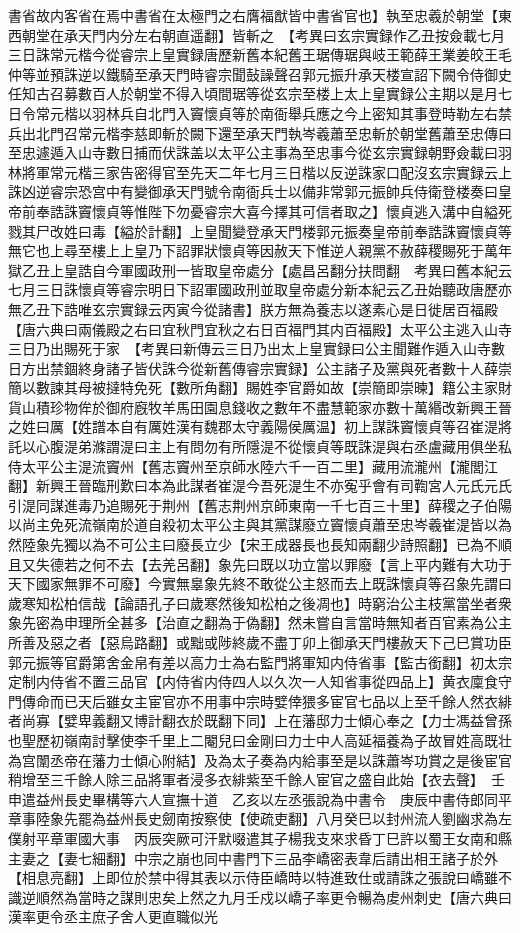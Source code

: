 書省故内客省在焉中書省在太極門之右膺福猷皆中書省官也】執至忠羲於朝堂【東西朝堂在承天門内分左右朝直遥翻】皆斬之　【考異曰玄宗實録作乙丑按僉載七月三日誅常元楷今從睿宗上皇實録唐歷新舊本紀舊王琚傳琚與岐王範薛王業姜皎王毛仲等並預誅逆以鐵騎至承天門時睿宗聞鼔譟聲召郭元振升承天楼宣詔下闕令侍御史任知古召募數百人於朝堂不得入頃間琚等從玄宗至楼上太上皇實録公主期以是月七日令常元楷以羽林兵自北門入竇懷貞等於南衙舉兵應之今上密知其事登時勒左右禁兵出北門召常元楷李慈即斬於闕下還至承天門執岑羲蕭至忠斬於朝堂舊蕭至忠傳曰至忠遽遁入山寺數日捕而伏誅盖以太平公主事為至忠事今從玄宗實録朝野僉載曰羽林將軍常元楷三家告密得官至先天二年七月三日楷以反逆誅家口配沒玄宗實録云上誅凶逆睿宗恐宫中有變御承天門號令南衙兵士以備非常郭元振帥兵侍衛登楼奏曰皇帝前奉誥誅竇懷貞等惟陛下勿憂睿宗大喜今擇其可信者取之】懷貞逃入溝中自縊死戮其尸改姓曰毒【縊於計翻】上皇聞變登承天門楼郭元振奏皇帝前奉誥誅竇懷貞等無它也上尋至樓上上皇乃下詔罪狀懷貞等因赦天下惟逆人親黨不赦薛稷賜死于萬年獄乙丑上皇誥自今軍國政刑一皆取皇帝處分【處昌呂翻分扶問翻　考異曰舊本紀云七月三日誅懷貞等睿宗明日下詔軍國政刑並取皇帝處分新本紀云乙丑始聽政唐歷亦無乙丑下誥唯玄宗實録云丙寅今從諸書】朕方無為養志以遂素心是日徙居百福殿【唐六典曰兩儀殿之右曰宜秋門宜秋之右日百福門其内百福殿】太平公主逃入山寺三日乃出賜死于家　【考異曰新傳云三日乃出太上皇實録曰公主聞難作遁入山寺數日方出禁錮終身諸子皆伏誅今從新舊傳睿宗實録】公主諸子及黨與死者數十人薛崇簡以數諫其母被撻特免死【數所角翻】賜姓李官爵如故【崇簡即崇暕】籍公主家財貨山積珍物侔於御府廐牧羊馬田園息錢收之數年不盡慧範家亦數十萬緡改新興王晉之姓曰厲【姓譜本自有厲姓漢有魏郡太守義陽侯厲温】初上謀誅竇懷貞等召崔湜將託以心腹湜弟滌謂湜曰主上有問勿有所隱湜不從懷貞等既誅湜與右丞盧藏用俱坐私侍太平公主湜流竇州【舊志竇州至京師水陸六千一百二里】藏用流瀧州【瀧閭江翻】新興王晉臨刑歎曰本為此謀者崔湜今吾死湜生不亦寃乎會有司鞫宮人元氏元氏引湜同謀進毒乃追賜死于荆州【舊志荆州京師東南一千七百三十里】薛稷之子伯陽以尚主免死流嶺南於道自殺初太平公主與其黨謀廢立竇懷貞蕭至忠岑羲崔湜皆以為然陸象先獨以為不可公主曰廢長立少【宋王成器長也長知兩翻少詩照翻】已為不順且又失德若之何不去【去羌呂翻】象先曰既以功立當以罪廢【言上平内難有大功于天下國家無罪不可廢】今實無辠象先終不敢從公主怒而去上既誅懷貞等召象先謂曰歲寒知松柏信哉【論語孔子曰歲寒然後知松柏之後凋也】時窮治公主枝黨當坐者衆象先密為申理所全甚多【治直之翻為于偽翻】然未嘗自言當時無知者百官素為公主所善及惡之者【惡烏路翻】或黜或陟終歲不盡丁卯上御承天門樓赦天下己巳賞功臣郭元振等官爵第舍金帛有差以高力士為右監門將軍知内侍省事【監古銜翻】初太宗定制内侍省不置三品官【内侍省内侍四人以久次一人知省事從四品上】黄衣廩食守門傳命而已天后雖女主宦官亦不用事中宗時嬖倖猥多宦官七品以上至千餘人然衣緋者尚寡【嬖卑義翻又博計翻衣於既翻下同】上在藩邸力士傾心奉之【力士馮益曾孫也聖歷初嶺南討擊使李千里上二閹兒曰金剛曰力士中人高延福養為子故冒姓高既壮為宫闈丞帝在藩力士傾心附結】及為太子奏為内給事至是以誅蕭岑功賞之是後宦官稍增至三千餘人除三品將軍者浸多衣緋紫至千餘人宦官之盛自此始【衣去聲】　壬申遣益州長史畢構等六人宣撫十道　乙亥以左丞張說為中書令　庚辰中書侍郎同平章事陸象先罷為益州長史劒南按察使【使疏吏翻】八月癸巳以封州流人劉幽求為左僕射平章軍國大事　丙辰突厥可汗默啜遣其子楊我支來求昏丁巳許以蜀王女南和縣主妻之【妻七細翻】中宗之崩也同中書門下三品李嶠密表韋后請出相王諸子於外【相息亮翻】上即位於禁中得其表以示侍臣嶠時以特進致仕或請誅之張說曰嶠雖不識逆順然為當時之謀則忠矣上然之九月壬戍以嶠子率更令暢為䖍州刺史【唐六典曰漢率更令丞主庶子舍人更直職似光